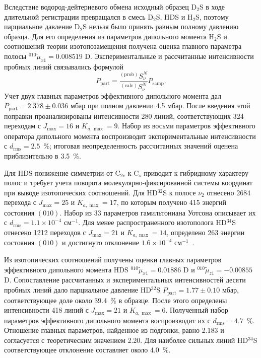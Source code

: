 Вследствие водород-дейтериевого обмена исходный образец D$_2$S в ходе длительной регистрации
превращался в смесь D$_2$S, HDS и H$_2$S, поэтому парциальное давление D$_2$S нельзя было принять
равным полному давлению образца. Для его определения из параметров дипольного момента H$_2$S и
соотношений теории изотопозамещения получена оценка главного параметра полосы
${}^{010}\widetilde{\mu}_{x1}=0.008519$ D. Экспериментальные и рассчитанные интенсивности пробных
линий связывались формулой
\begin{equation}
P_{\textrm{part}}=
\frac{{}^{(\textrm{prob})}S^N_{\nu}}{{}^{(\textrm{calc})}S^N_{\nu}}
P_{\textrm{samp}}.
\label{eq:syn_pressure}
\end{equation}
Учет двух главных параметров эффективного дипольного момента дал
$P_{\textrm{part}}=2.378\pm0.036$ мбар при полном давлении 4.5 мбар. После введения этой поправки
проанализированы интенсивности 280 линий, соответствующих 324 переходам с $J_{\max}=16$ и
$K_{a,\max}=9$. Набор из восьми параметров эффективного оператора дипольного момента воспроизводит
экспериментальные интенсивности с $d_{\textrm{rms}}=2.5$~\%; итоговая неопределенность рассчитанных
значений оценена приблизительно в 3.5~\%.

Для HDS понижение симметрии от C$_{2v}$ к C$_s$ приводит к гибридному характеру полос и требует
учета поворота молекулярно-фиксированной системы координат при выводе изотопических соотношений.
Для HD$^{32}$S к полосе $\nu_2$ отнесено 2684 перехода с $J_{\max}=25$ и
$K_{a,\max}=17$, по которым получено 415 энергий состояния $(010)$. Набор из 33 параметров
гамильтониана Уотсона описывает их с $d_{\textrm{rms}}=1.1\times10^{-4}$ см$^{-1}$. Для менее
распространенного изотополога HD$^{34}$S отнесено 1212 переходов с $J_{\max}=21$ и
$K_{a,\max}=14$, определено 263 энергии состояния $(010)$ и достигнуто отклонение
$1.6\times10^{-4}$ см$^{-1}$~\cite{hds_sydow2019}.

Из изотопических соотношений получены оценки главных параметров эффективного дипольного момента HDS
${}^{010}\widetilde{\mu}_{x1}=0.01886$ D и
${}^{010}\widetilde{\mu}_{z1}=-0.00855$ D. Сопоставление рассчитанных и экспериментальных
интенсивностей десяти пробных линий дало парциальное давление HD$^{32}$S
$P_{\textrm{part}}=1.77\pm0.10$ мбар, соответствующее доле около 39.4~\% в образце. После этого
определены интенсивности 418 линий с $J_{\max}=21$ и $K_{a,\max}=6$. Полученный набор параметров
эффективного дипольного момента воспроизводит их с $d_{\textrm{rms}}=4.7$~\%. Отношение главных
параметров, найденное из подгонки, равно 2.183 и согласуется с теоретическим значением 2.20. Для
наиболее сильных линий HD$^{34}$S соответствующее отклонение составляет около 4.0~\%.


